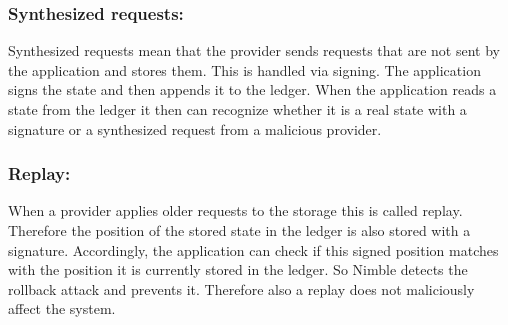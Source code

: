 	\subsubsection*{Synthesized requests:} Synthesized requests mean that the provider sends requests that are not sent by the application and stores them. This is handled via signing. The application signs the state and then appends it to the ledger. When the application reads a state from the ledger it then can recognize whether it is a real state with a signature or a synthesized request from a malicious provider.
	\subsubsection*{Replay:} When a provider applies older requests to the storage this is called replay. Therefore the position of the stored state in the ledger is also stored with a signature. Accordingly, the application can check if this signed position matches with the position it is currently stored in the ledger. So Nimble detects the rollback attack and prevents it. Therefore also a replay does not maliciously affect the system.\\
	
